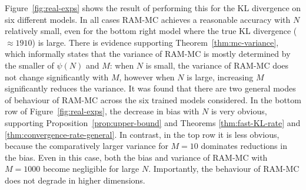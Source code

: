 
Figure~\ref{fig:real-exps} shows the result of performing this for the KL divergence on six different models.
In all cases RAM-MC achieves a reasonable accuracy with $N$ relatively small, even for the bottom right model where the true KL divergence ($\approx 1910$) is large.
There is evidence supporting Theorem~\ref{thm:mc-variance}, which informally states that the variance of RAM-MC is mostly determined by the smaller of $\psi(N)$ and $M$:
when $N$ is small, the variance of RAM-MC does not change significantly with $M$, 
however when $N$ is large, increasing $M$ significantly reduces the variance. 
It was found that there are two general modes of behaviour of RAM-MC across the six trained models considered. 
In the bottom row of Figure~\ref{fig:real-exps}, the decrease in bias with $N$ is very obvious, supporting Proposition~\ref{prop:upper-bound} and Theorems \ref{thm:fast-KL-rate} and \ref{thm:convergence-rate-general}.
In contrast, in the top row it is less obvious, because the comparatively larger variance for $M{=}10$ dominates reductions in the bias.
Even in this case, both the bias and variance of RAM-MC with $M{=}1000$ become negligible for large $N$.
Importantly, the behaviour of RAM-MC does not degrade in higher dimensions.

